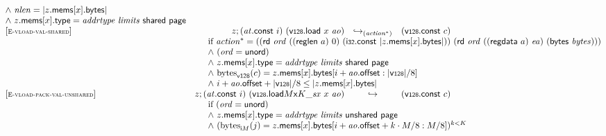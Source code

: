 $$\begin{array}[t]{@{}lrcl@{}l@{}}
{\begin{array}[t]{@{}l@{}}
{\land}~ {\mathit{nlen}} = {|z{.}\mathsf{mems}{}[x]{.}\mathsf{bytes}|} \\
{\land}~ z{.}\mathsf{mems}{}[x]{.}\mathsf{type} = {\mathit{addrtype}}~{\mathit{limits}}~\mathsf{shared}~\mathsf{page} \\
\end{array}
} \\
{[\textsc{\scriptsize E{-}vload{-}val{-}shared}]} \quad & z ; ({\mathit{at}}{.}\mathsf{const}~i)~(\mathsf{v{\scriptstyle 128}}{.}\mathsf{load}~x~{\mathit{ao}}) & {\hookrightarrow}_{({{\mathit{action}}^\ast})} {} & (\mathsf{v{\scriptstyle 128}}{.}\mathsf{const}~c) &  \\
& \multicolumn{4}{@{}l@{}}{\quad
\quad
\begin{array}[t]{@{}l@{}}
\mbox{if}~ {{\mathit{action}}^\ast} = ((\mathsf{rd}~{\mathit{ord}}~((\mathsf{reglen}~a)~0)~(\mathsf{i{\scriptstyle 32}}{.}\mathsf{const}~{|z{.}\mathsf{mems}{}[x]{.}\mathsf{bytes}|}))~(\mathsf{rd}~{\mathit{ord}}~((\mathsf{regdata}~a)~{\mathit{ea}})~(\mathsf{bytes}~{\mathit{bytes}}))) \\
{\land}~ ({\mathit{ord}} = \mathsf{unord}) \\
{\land}~ z{.}\mathsf{mems}{}[x]{.}\mathsf{type} = {\mathit{addrtype}}~{\mathit{limits}}~\mathsf{shared}~\mathsf{page} \\
{\land}~ {{\mathrm{bytes}}}_{\mathsf{v{\scriptstyle 128}}}(c) = z{.}\mathsf{mems}{}[x]{.}\mathsf{bytes}{}[i + {\mathit{ao}}{.}\mathsf{offset} : {|\mathsf{v{\scriptstyle 128}}|} / 8] \\
{\land}~ i + {\mathit{ao}}{.}\mathsf{offset} + {|\mathsf{v{\scriptstyle 128}}|} / 8 \leq {|z{.}\mathsf{mems}{}[x]{.}\mathsf{bytes}|} \\
\end{array}
} \\
{[\textsc{\scriptsize E{-}vload{-}pack{-}val{-}unshared}]} \quad & z ; ({\mathit{at}}{.}\mathsf{const}~i)~({\mathsf{v{\scriptstyle 128}}{.}\mathsf{load}}{{M}{\mathsf{x}}{K}{\mathsf{\_}}{{\mathit{sx}}}}~x~{\mathit{ao}}) & \hookrightarrow & (\mathsf{v{\scriptstyle 128}}{.}\mathsf{const}~c) &  \\
& \multicolumn{4}{@{}l@{}}{\quad
\quad
\begin{array}[t]{@{}l@{}}
\mbox{if}~ ({\mathit{ord}} = \mathsf{unord}) \\
{\land}~ z{.}\mathsf{mems}{}[x]{.}\mathsf{type} = {\mathit{addrtype}}~{\mathit{limits}}~\mathsf{unshared}~\mathsf{page} \\
{\land}~ ({{\mathrm{bytes}}}_{{\mathsf{i}}{M}}(j) = z{.}\mathsf{mems}{}[x]{.}\mathsf{bytes}{}[i + {\mathit{ao}}{.}\mathsf{offset} + k \cdot M / 8 : M / 8])^{k<K} \\

\end{array}}
\end{array}$$
